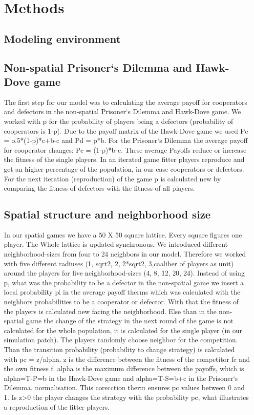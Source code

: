 \section{Methods}

\subsection{Modeling environment}

\subsection{Non-spatial Prisoner`s Dilemma and Hawk-Dove game}

The first step for our model was to calculating the average payoff for cooperators and defectors in the non-spatial Prisoner`s Dilemma and Hawk-Dove game. We worked with p for the probability of players being a  defectors (probability of cooperators is 1-p). Due to the payoff matrix of the Hawk-Dove game we used Pc = o.5*(1-p)*c+b-c and Pd = p*b. For the Prisoner`s Dilemma the average payoff for cooperator changes: Pc = (1-p)*b-c. These average Payoffs reduce or increase the fitness of the single players. In an iterated game fitter players reproduce and get an higher percentage of the population, in our case cooperators or defectors. For the next iteration (reproduction) of the game p is calculated new by comparing the fitness of defectors with the fitness of all players.

\subsection{Spatial structure and neighborhood size}
In our spatial games we have a 50 X 50 square lattice. Every square figures one player. The Whole lattice is updated synchronous. We introduced different neighborhood-sizes from four to 24 neighbors in our model. Therefore we worked with five different radiuses (1, sqrt2, 2, 2*sqrt2, 3,caaliber of players as unit) around the players for five neighborhood-sizes (4, 8, 12, 20, 24). Instead of using p, what was the probability to be a defector in the non-spatial game we insert a local probability pl in the average payoff therms which was calculated with the neighbors probabilities to be a cooperator or defector. With that the fitness of the players is calculated new facing the neighborhood. Else than in the non-spatial game the change of the strategy in the next round of the game is not calculated for the whole population, it is calculated for the single player (in our simulation patch). The players randomly choose neighbor for the competition. Than the transition probability (probability to change strategy) is calculated with pc = z/alpha. z is the difference between the fitness of the competitor fc and the own fitness f. alpha is the maximum difference between the payoffs, which is alpha=T-P=b in the Hawk-Dove game and alpha=T-S=b+c in the Prisoner`s Dilemma. normalisation. This corecction therm ensures pc values between 0 and 1. Is z>0 the player changes the strategy with the probability pc, what illustrates a reproduction of the fitter players.

